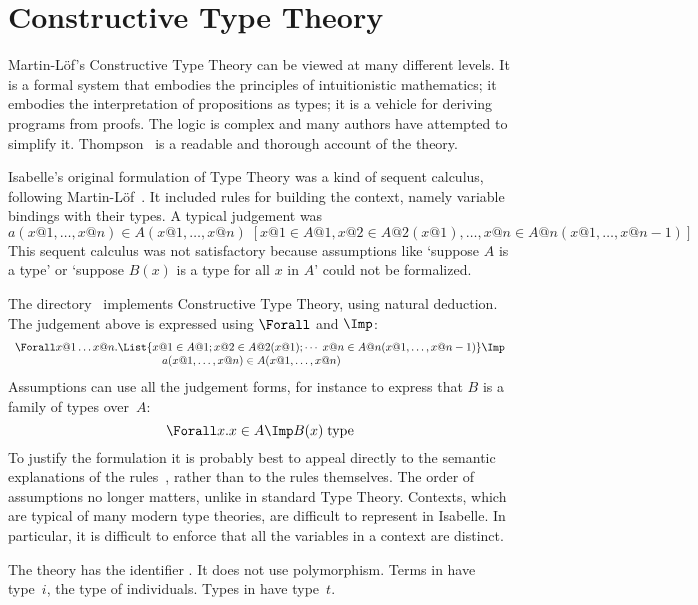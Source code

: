 \chapter{Constructive Type Theory}
Martin-L\"of's Constructive Type Theory \cite{martinlof84,nordstrom90} can
be viewed at many different levels.  It is a formal system that embodies
the principles of intuitionistic mathematics; it embodies the
interpretation of propositions as types; it is a vehicle for deriving
programs from proofs.  The logic is complex and many authors have attempted
to simplify it.  Thompson~\cite{thompson91} is a readable and thorough
account of the theory.

Isabelle's original formulation of Type Theory was a kind of sequent
calculus, following Martin-L\"of~\cite{martinlof84}.  It included rules for
building the context, namely variable bindings with their types.  A typical
judgement was
\[   a(x@1,\ldots,x@n)\in A(x@1,\ldots,x@n) \; 
    [ x@1\in A@1, x@2\in A@2(x@1), \ldots, x@n\in A@n(x@1,\ldots,x@{n-1}) ]
\]
This sequent calculus was not satisfactory because assumptions like
`suppose $A$ is a type' or `suppose $B(x)$ is a type for all $x$ in $A$'
could not be formalized.  

The directory~ implements Constructive Type Theory, using
natural deduction.  The judgement above is expressed using $\Forall$ and
$\Imp$:
\[ \begin{array}{r@{}l}
     \Forall x@1\ldots x@n. &
	  \List{x@1\in A@1; 
		x@2\in A@2(x@1); \cdots \; 
		x@n\in A@n(x@1,\ldots,x@{n-1})} \Imp \\
     &  \qquad\qquad a(x@1,\ldots,x@n)\in A(x@1,\ldots,x@n) 
    \end{array}
\]
Assumptions can use all the judgement forms, for instance to express that
$B$ is a family of types over~$A$:
\[ \Forall x . x\in A \Imp B(x)\;{\rm type} \]
To justify the {\CTT} formulation it is probably best to appeal directly
to the semantic explanations of the rules~\cite{martinlof84}, rather than
to the rules themselves.  The order of assumptions no longer matters,
unlike in standard Type Theory.  Contexts, which are typical of many modern
type theories, are difficult to represent in Isabelle.  In particular, it
is difficult to enforce that all the variables in a context are distinct.

The theory has the {\ML} identifier .  It does not
use polymorphism.  Terms in {\CTT} have type~$i$, the type of individuals.
Types in {\CTT} have type~$t$.

